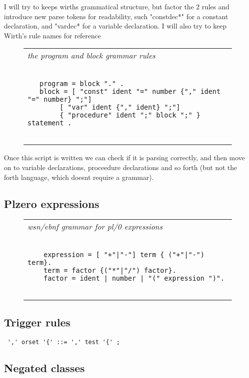 \documentclass[a4paper,12pt]{article}
\begin{document}
  I will try to keeps wirths grammatical structure, but factor the
  2 rules and introduce new parse tokens for readability, such
  "constdec*" for a constant declaration, and "vardec* for a variable
  declaration. I will also try to keep Wirth's rule names for reference
 \begin{figure}
 \begin{tabular}{ l }
 \emph{ the program and block grammar rules } \\ 
 \begin{lstlisting}[breaklines] 

   program = block "." .
   block = [ "const" ident "=" number {"," ident "=" number} ";"]
        [ "var" ident {"," ident} ";"]
        { "procedure" ident ";" block ";" } statement .
  
 \end{lstlisting} 
 \end{tabular} 

 \end{figure}

  Once this script is written we can check if it is parsing
  correctly, and then move on to variable declarations, proceedure
  declarations and so forth (but not the forth language, which doesnt
  require a grammar).

\subsection{Plzero expressions}
 \begin{figure}
 \begin{tabular}{ l }
 \emph{ wsn/ebnf grammar for pl/0 expressions } \\ 
 \begin{lstlisting}[breaklines] 

    expression = [ "+"|"-"] term { ("+"|"-") term}.
    term = factor {("*"|"/") factor}.
    factor = ident | number | "(" expression ")".
  
 \end{lstlisting} 
 \end{tabular} 

 \end{figure}

\subsection{Trigger rules} 
 \verb| ',' orset '{' ::= ',' test '{' ; |


\subsection{Negated classes}
\end{document}
